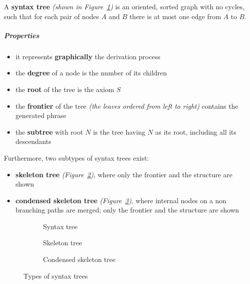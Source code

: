 \documentclass[english]{article}
\begin{document}
A \textbf{syntax tree} \textit{(shown in Figure~\ref{subfig:syntax-tree})} is an oriented, sorted graph with no cycles, such that for each pair of nodes \(A\) and \(B\) there is at most one edge from \(A\) to \(B\).

\subparagraph*{Properties}

\begin{itemize}
  \item it represents \textbf{graphically} the derivation process
  \item the \textbf{degree} of a node is the number of its children
  \item the \textbf{root} of the tree is the axiom \(S\)
  \item the \textbf{frontier} of the tree \textit{(the leaves ordered from left to right)} contains the generated phrase
  \item the \textbf{subtree} with root \(N\) is the tree having \(N\) as its root, including all its descendants
\end{itemize}

Furthermore, two subtypes of syntax trees exist:

\begin{itemize}
  \item \textbf{skeleton tree} \textit{(Figure~\ref{subfig:skeleton-tree})}, where only the frontier and the structure are shown
  \item \textbf{condensed skeleton tree} \textit{(Figure~\ref{subfig:condensed-skeleton-tree})}, where internal nodes on a non branching paths are merged; only the frontier and the structure are shown
\end{itemize}

\begin{figure}[htbp]
  \bigskip
  \centering
  \begin{subfigure}[t]{0.99\textwidth}
    \bigskip
    \centering
    \caption{Syntax tree}
    \label{subfig:syntax-tree}
    \bigskip
  \end{subfigure}
  \bigskip
  \begin{subfigure}[t]{0.495\textwidth}
    \bigskip
    \centering
    \caption{Skeleton tree}
    \label{subfig:skeleton-tree}
    \bigskip
  \end{subfigure}
  \begin{subfigure}[t]{0.495\textwidth}
    \bigskip
    \centering
        \caption{Condensed skeleton tree}
    \label{subfig:condensed-skeleton-tree}
    \bigskip
  \end{subfigure}

  \caption{Types of syntax trees}
  \label{fig:types-of-syntax-trees}
\end{figure}
\end{document}
